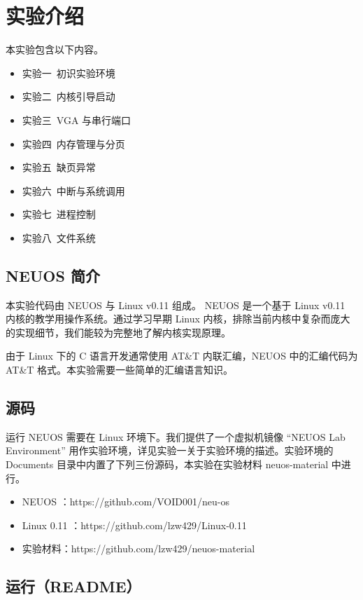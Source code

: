 \section{实验介绍}

本实验包含以下内容。

\begin{itemize}
	\item 实验一\ 初识实验环境
	\item 实验二\ 内核引导启动
	\item 实验三\ VGA 与串行端口
	\item 实验四\ 内存管理与分页
	\item 实验五\ 缺页异常
	\item 实验六\ 中断与系统调用
	\item 实验七\ 进程控制
	\item 实验八\ 文件系统
\end{itemize}

\subsection{NEUOS 简介}

本实验代码由 NEUOS 与 Linux v0.11 组成。 NEUOS 是一个基于 Linux v0.11 内核的教学用操作系统。通过学习早期 Linux 内核，排除当前内核中复杂而庞大的实现细节，我们能较为完整地了解内核实现原理。

由于 Linux 下的 C 语言开发通常使用 AT\&T 内联汇编，NEUOS 中的汇编代码为 AT\&T 格式。本实验需要一些简单的汇编语言知识。

\subsection{源码}

运行 NEUOS 需要在 Linux 环境下。我们提供了一个虚拟机镜像 “NEUOS Lab Environment” 用作实验环境，详见实验一关于实验环境的描述。实验环境的 Documents 目录中内置了下列三份源码，本实验在实验材料 neuos-material 中进行。

\begin{itemize}
	\item NEUOS ：https://github.com/VOID001/neu-os
	\item Linux 0.11 ：https://github.com/lzw429/Linux-0.11
	\item 实验材料：https://github.com/lzw429/neuos-material
\end{itemize}

\subsection{运行（README）}

